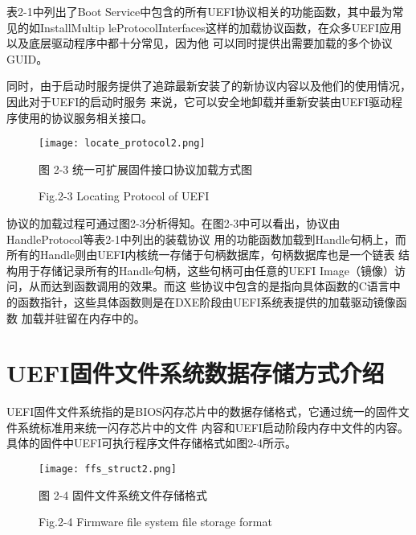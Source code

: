 表2-1中列出了Boot Service中包含的所有UEFI协议相关的功能函数，其中最为常见的如InstallMultip
leProtocolInterfaces这样的加载协议函数，在众多UEFI应用以及底层驱动程序中都十分常见，因为他
可以同时提供出需要加载的多个协议GUID。
\par 同时，由于启动时服务提供了追踪最新安装了的新协议内容以及他们的使用情况，因此对于UEFI的启动时服务
来说，它可以安全地卸载并重新安装由UEFI驱动程序使用的协议服务相关接口。

\begin{figure}[htb]
    \vspace{0cm}   
    \setlength{\abovecaptionskip}{0.3cm}  
	\centering
    \texttt{[image: locate\_protocol2.png]}
    \caption*{图 2-3 统一可扩展固件接口协议加载方式图}
    \setlength{\belowcaptionskip}{-0.7cm}
    \caption*{Fig.2-3 Locating Protocol of UEFI}
\end{figure}

\par 协议的加载过程可通过图2-3分析得知。在图2-3中可以看出，协议由HandleProtocol等表2-1中列出的装载协议
用的功能函数加载到Handle句柄上，而所有的Handle则由UEFI内核统一存储于句柄数据库，句柄数据库也是一个链表
结构用于存储记录所有的Handle句柄，这些句柄可由任意的UEFI Image（镜像）访问，从而达到函数调用的效果。而这
些协议中包含的是指向具体函数的C语言中的函数指针，这些具体函数则是在DXE阶段由UEFI系统表提供的加载驱动镜像函数
加载并驻留在内存中的。

%
%
\section{UEFI固件文件系统数据存储方式介绍}
UEFI固件文件系统指的是BIOS闪存芯片中的数据存储格式，它通过统一的固件文件系统标准用来统一闪存芯片中的文件
内容和UEFI启动阶段内存中文件的内容\cite{chinese21}。具体的固件中UEFI可执行程序文件存储格式如图2-4所示。

\begin{figure}[htb]
    \vspace{0cm}   
    \setlength{\abovecaptionskip}{0.3cm}  
	\centering
    \texttt{[image: ffs\_struct2.png]}
    \caption*{图 2-4 固件文件系统文件存储格式}
    \setlength{\belowcaptionskip}{-0.4cm}
    \caption*{Fig.2-4 Firmware file system file storage format}
\end{figure}

